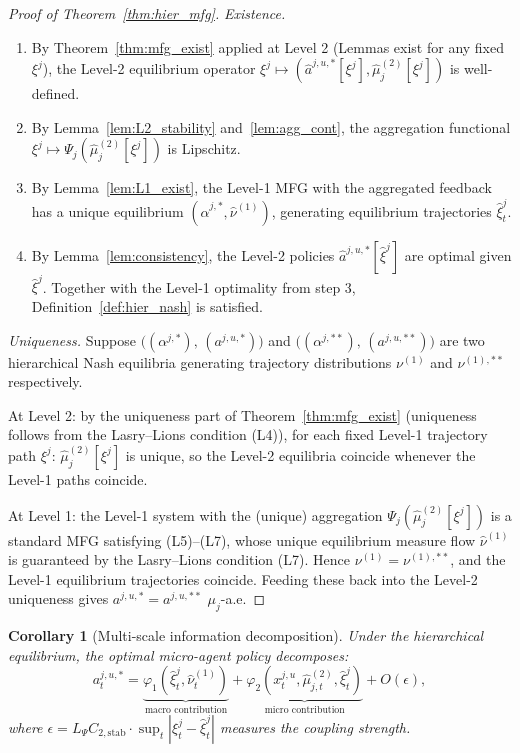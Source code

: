 \documentclass[12pt,a4paper]{article}
\theoremstyle{plain}
\newtheorem{corollary}[theorem]{Corollary}
\theoremstyle{definition}
\newcommand{\1}{\mathbbm{1}}
\newcommand{\vp}{\varphi}
\begin{document}
\begin{proof}[Proof of Theorem~\ref{thm:hier_mfg}]
\textit{Existence.}
\begin{enumerate}
\item By Theorem~\ref{thm:mfg_exist} applied at Level 2 (Lemmas exist for any
  fixed $\xi^j$), the Level-2 equilibrium operator $\xi^j \mapsto
  (\hat{a}^{j,u,*}[\xi^j], \hat\mu^{(2)}_j[\xi^j])$ is well-defined.
\item By Lemma~\ref{lem:L2_stability} and~\ref{lem:agg_cont}, the aggregation
  functional $\xi^j \mapsto \Psi_j(\hat\mu^{(2)}_j[\xi^j])$ is Lipschitz.
\item By Lemma~\ref{lem:L1_exist}, the Level-1 MFG with the aggregated
  feedback has a unique equilibrium $(\hat\alpha^{j,*}, \hat\nu^{(1)})$,
  generating equilibrium trajectories $\hat\xi^j_t$.
\item By Lemma~\ref{lem:consistency}, the Level-2 policies
  $\hat{a}^{j,u,*}[\hat\xi^j]$ are optimal given $\hat\xi^j$.
  Together with the Level-1 optimality from step 3, Definition~\ref{def:hier_nash}
  is satisfied.
\end{enumerate}

\textit{Uniqueness.}
Suppose $\bigl((\alpha^{j,*}),\, (a^{j,u,*})\bigr)$ and
$\bigl((\alpha^{j,**}),\, (a^{j,u,**})\bigr)$ are two hierarchical Nash
equilibria generating trajectory distributions $\nu^{(1)}$ and $\nu^{(1),**}$
respectively.

At Level 2: by the uniqueness part of Theorem~\ref{thm:mfg_exist} (uniqueness
follows from the Lasry--Lions condition (L4)), for each fixed Level-1
trajectory path $\xi^j$:
$\hat\mu^{(2)}_j[\xi^j]$ is unique, so the Level-2 equilibria coincide whenever
the Level-1 paths coincide.

At Level 1: the Level-1 system with the (unique) aggregation
$\Psi_j(\hat\mu^{(2)}_j[\xi^j])$ is a standard MFG satisfying (L5)--(L7),
whose unique equilibrium measure flow $\hat\nu^{(1)}$ is guaranteed by the
Lasry--Lions condition (L7).  Hence $\nu^{(1)} = \nu^{(1),**}$, and the
Level-1 equilibrium trajectories coincide.  Feeding these back into the
Level-2 uniqueness gives $a^{j,u,*} = a^{j,u,**}$ $\mu_j$-a.e.
\end{proof}

\begin{corollary}[Multi-scale information decomposition]
\label{cor:multiscale}
Under the hierarchical equilibrium, the optimal micro-agent policy decomposes:
\[
a^{j,u,*}_t
= \underbrace{\vp_1(\hat\xi^j_t, \hat\nu^{(1)}_t)}_{\text{macro contribution}}
+ \underbrace{\vp_2(x^{j,u}_t, \hat\mu^{(2)}_{j,t}, \hat\xi^j_t)}_{\text{micro contribution}}
+ O(\epsilon),
\]
where $\epsilon = L_\Psi C_{2,\mathrm{stab}} \cdot \sup_t|\xi^j_t - \hat\xi^j_t|$
measures the coupling strength.
\end{corollary}
\end{document}
